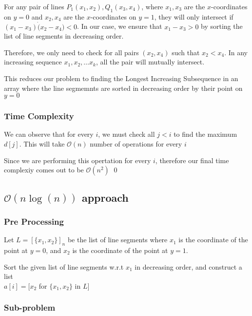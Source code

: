 \documentclass[12pt]{article}
\begin{document}
For any pair of lines $P_1(x_1, x_2), Q_1(x_3, x_4)$, where $x_1, x_3$ are the $x$-coordinates on $y = 0$ and $x_2, x_4$ are the $x$-coordinates on $y = 1$, they will only intersect if $(x_1 - x_3) \dot (x_2 - x_4) < 0$. In our case, we ensure that $x_1 - x_3 > 0$ by sorting the list of line segments in decreasing order. 

Therefore, we only need to check for all pairs $(x_2, x_4)$ such that $x_2 < x_4$. In any increasing sequence $x_1, x_2, \dots x_k$, all the pair will mutually intersect. 

This reduces our problem to finding the Longest Increasing Subsequence in an array where the line segmemnts are sorted in decreasing order by their point on $y = 0$ 


\subsubsection{Time Complexity}

We can observe that for every $i$, we must check all $j < i$ to find the maximum $d[j]$. This will take $\mathcal{O}(n)$ number of operations for every $i$

Since we are performing this opertation for every $i$, therefore our final time complexiy comes out to be $\mathcal{O}(n^2)$
\qed












\pagebreak

\subsection{\texorpdfstring{$\mathcal{O}(n\log(n))$}{Lg} approach}

\subsubsection{Pre Processing}

Let $L = [\{x_1, x_2\}]_n$ be the list of line segments where $x_1$ is the coordinate of the point at $y = 0$, and $x_2$ is the coordinate of the point at $y = 1$. 

Sort the given list of line segments w.r.t $x_1$ in decreasing order, and construct a list \\ $a[i] = [x_2$ for $\{x_1, x_2\}$ in $L]$ 


\subsubsection{Sub-problem}
\end{document}
